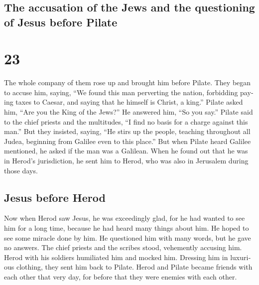 \begin{paracol}{2}
\begin{otherlanguage}{english}
\switchcolumn
\begin{otherlanguage}{english}

\hypertarget{the-accusation-of-the-jews-and-the-questioning-of-jesus-before-pilate}{%
\subsection{The accusation of the Jews and the questioning of Jesus
before
Pilate}\label{the-accusation-of-the-jews-and-the-questioning-of-jesus-before-pilate}}

\hypertarget{section-28}{%
\section{23}\label{section-28}}

 The whole company of them rose up and brought him before
Pilate.  They began to accuse him, saying, ``We found this
man perverting the nation, forbidding paying taxes to Caesar, and saying
that he himself is Christ, a king.''  Pilate asked him,
``Are you the King of the Jews?'' He answered him, ``So you say.''
 Pilate said to the chief priests and the multitudes, ``I
find no basis for a charge against this man.''  But they
insisted, saying, ``He stirs up the people, teaching throughout all
Judea, beginning from Galilee even to this place.''  But
when Pilate heard Galilee mentioned, he asked if the man was a Galilean.
 When he found out that he was in Herod's jurisdiction, he
sent him to Herod, who was also in Jerusalem during those days.

\hypertarget{jesus-before-herod}{%
\subsection{Jesus before Herod}\label{jesus-before-herod}}

 Now when Herod saw Jesus, he was exceedingly glad, for he
had wanted to see him for a long time, because he had heard many things
about him. He hoped to see some miracle done by him.  He
questioned him with many words, but he gave no answers. 
The chief priests and the scribes stood, vehemently accusing him.
 Herod with his soldiers humiliated him and mocked him.
Dressing him in luxurious clothing, they sent him back to Pilate.
 Herod and Pilate became friends with each other that
very day, for before that they were enemies with each other.


\end{otherlanguage}
\end{otherlanguage}
\end{paracol}
